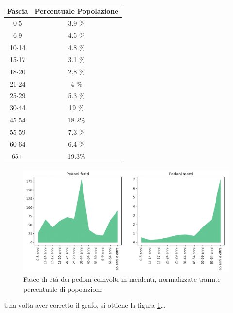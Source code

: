 \documentclass[a4paper]{report}
\begin{document}
\begin{center}
    \def\arraystretch{1.5}%
    \begin{tabular}{ |c|c| } 
    \hline
    Fascia & Percentuale Popolazione \\ 
    \hline
    \rowcolor{TableGray}
    0-5     & 3.9 \% \\ 
    6-9     & 4.5 \% \\
    \rowcolor{TableGray}
    10-14   & 4.8 \% \\
    15-17   & 3.1 \% \\
    \rowcolor{TableGray}
    18-20   & 2.8 \% \\ 
    21-24   & 4   \% \\
    \rowcolor{TableGray}
    25-29   & 5.3 \% \\
    30-44   & 19  \% \\
    \rowcolor{TableGray}
    45-54   & 18.2\% \\ 
    55-59   & 7.3 \% \\
    \rowcolor{TableGray}
    60-64   & 6.4 \% \\
    65$+$   & 19.3\% \\
    \hline
    \end{tabular}
\end{center}


\begin{figure}
    \includegraphics[width=\linewidth]{../src/incidenti/incidenti_senza_coords/pedoni/eta_pedoni_norm.png}
    \caption{Fasce di età dei pedoni coinvolti in incidenti, normalizzate tramite percentuale di popolazione}
    \label{fig:eta-pedoni-norm}
\end{figure}

Una volta aver corretto il grafo, si ottiene la figura \ref{fig:eta-pedoni-norm}\dots


\end{document}
